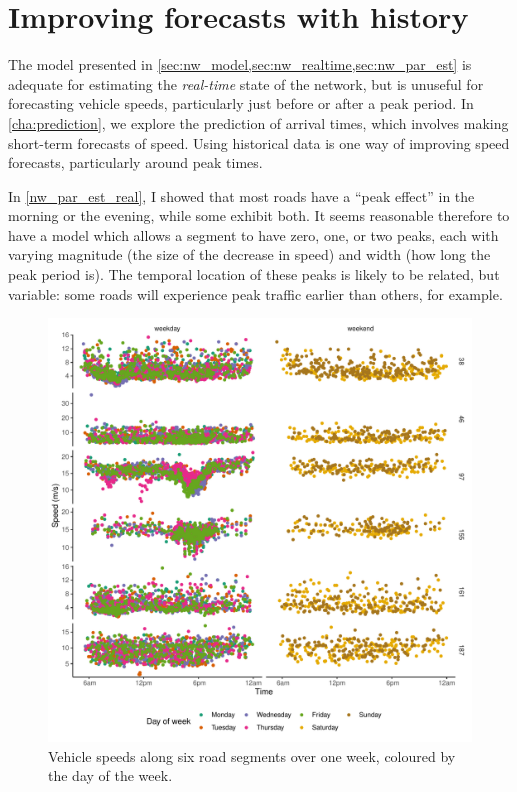 \section{Improving forecasts with history}
\label{sec:nw_hist_model}

The model presented in \cref{sec:nw_model,sec:nw_realtime,sec:nw_par_est} is adequate for estimating the \emph{real-time} state of the network, but is unuseful for forecasting vehicle speeds, particularly just before or after a peak period. In \cref{cha:prediction}, we explore the prediction of arrival times, which involves making short-term forecasts of speed. Using historical data is one way of improving speed forecasts, particularly around peak times.


In \cref{nw_par_est_real}, I showed that most roads have a ``peak effect'' in the morning or the evening, while some exhibit both. It seems reasonable therefore to have a model which allows a segment to have zero, one, or two peaks, each with varying magnitude (the size of the decrease in speed) and width (how long the peak period is). The temporal location of these peaks is likely to be related, but variable: some roads will experience peak traffic earlier than others, for example.

\begin{knitrout}\small
{}\color{fgcolor}\begin{figure}

{\centering \includegraphics[width=\textwidth]{figure/tt_week0_load-1} 

}

\caption[Vehicle speeds along six road segments over one week]{Vehicle speeds along six road segments over one week, coloured by the day of the week.}\label{fig:tt_week0_load}
\end{figure}


\end{knitrout}

